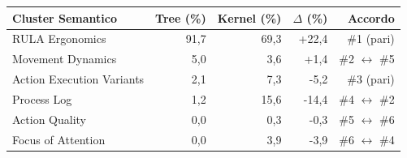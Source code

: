 \begin{tabular*}{\linewidth}{@{}l@{\extracolsep{\fill}}rrrr@{}}
\toprule
\textbf{Cluster Semantico} & \textbf{Tree (\%)} & \textbf{Kernel (\%)} & \textbf{$\Delta$ (\%)} & \textbf{Accordo} \\
\midrule
RULA Ergonomics & 91{,}7 & 69{,}3 & +22{,}4 & \#1 (pari) \\
Movement Dynamics & 5{,}0 & 3{,}6 & +1{,}4 & \#2 $\leftrightarrow$ \#5 \\
Action Execution Variants & 2{,}1 & 7{,}3 & -5{,}2 & \#3 (pari) \\
Process Log & 1{,}2 & 15{,}6 & -14{,}4 & \#4 $\leftrightarrow$ \#2 \\
Action Quality & 0{,}0 & 0{,}3 & -0{,}3 & \#5 $\leftrightarrow$ \#6 \\
Focus of Attention & 0{,}0 & 3{,}9 & -3{,}9 & \#6 $\leftrightarrow$ \#4 \\
\bottomrule
\end{tabular*}
